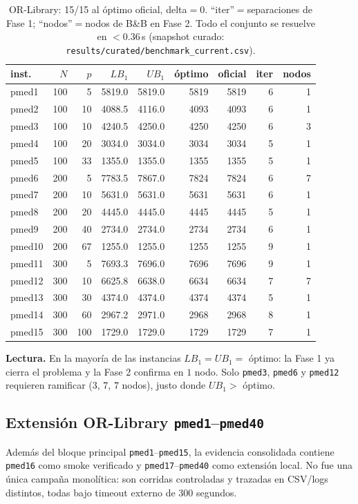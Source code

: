 \begin{table}[h]\centering\small
\begin{tabular}{lrrrrrrrr}
\toprule
inst. & $N$ & $p$ & $LB_1$ & $UB_1$ & óptimo & oficial & iter & nodos \\
\midrule
pmed1  & 100 & 5   & 5819.0 & 5819.0 & 5819 & 5819 & 6 & 1 \\
pmed2  & 100 & 10  & 4088.5 & 4116.0 & 4093 & 4093 & 6 & 1 \\
pmed3  & 100 & 10  & 4240.5 & 4250.0 & 4250 & 4250 & 6 & 3 \\
pmed4  & 100 & 20  & 3034.0 & 3034.0 & 3034 & 3034 & 5 & 1 \\
pmed5  & 100 & 33  & 1355.0 & 1355.0 & 1355 & 1355 & 5 & 1 \\
pmed6  & 200 & 5   & 7783.5 & 7867.0 & 7824 & 7824 & 6 & 7 \\
pmed7  & 200 & 10  & 5631.0 & 5631.0 & 5631 & 5631 & 6 & 1 \\
pmed8  & 200 & 20  & 4445.0 & 4445.0 & 4445 & 4445 & 5 & 1 \\
pmed9  & 200 & 40  & 2734.0 & 2734.0 & 2734 & 2734 & 6 & 1 \\
pmed10 & 200 & 67  & 1255.0 & 1255.0 & 1255 & 1255 & 9 & 1 \\
pmed11 & 300 & 5   & 7693.3 & 7696.0 & 7696 & 7696 & 9 & 1 \\
pmed12 & 300 & 10  & 6625.8 & 6638.0 & 6634 & 6634 & 7 & 7 \\
pmed13 & 300 & 30  & 4374.0 & 4374.0 & 4374 & 4374 & 5 & 1 \\
pmed14 & 300 & 60  & 2967.2 & 2971.0 & 2968 & 2968 & 8 & 1 \\
pmed15 & 300 & 100 & 1729.0 & 1729.0 & 1729 & 1729 & 7 & 1 \\
\bottomrule
\end{tabular}
\caption{OR-Library: 15/15 al óptimo oficial, delta$=0$. ``iter''$=$separaciones de Fase 1;
``nodos''$=$nodos de B\&B en Fase 2. Todo el conjunto se resuelve en $<0.36$\,s
(snapshot curado: \texttt{results/curated/benchmark\_current.csv}).}
\label{tab:orlib}
\end{table}

\textbf{Lectura.} En la mayoría de las instancias $LB_1=UB_1=$ óptimo: la Fase 1 ya cierra el
problema y la Fase 2 confirma en $1$ nodo. Solo \texttt{pmed3}, \texttt{pmed6} y \texttt{pmed12}
requieren ramificar ($3$, $7$, $7$ nodos), justo donde $UB_1>$ óptimo.

\subsection{Extensión OR-Library \texttt{pmed1}--\texttt{pmed40}}
Además del bloque principal \texttt{pmed1}--\texttt{pmed15}, la evidencia consolidada contiene
\texttt{pmed16} como smoke verificado y \texttt{pmed17}--\texttt{pmed40} como extensión local. No
fue una única campaña monolítica: son corridas controladas y trazadas en CSV/logs distintos, todas
bajo timeout externo de 300 segundos.

